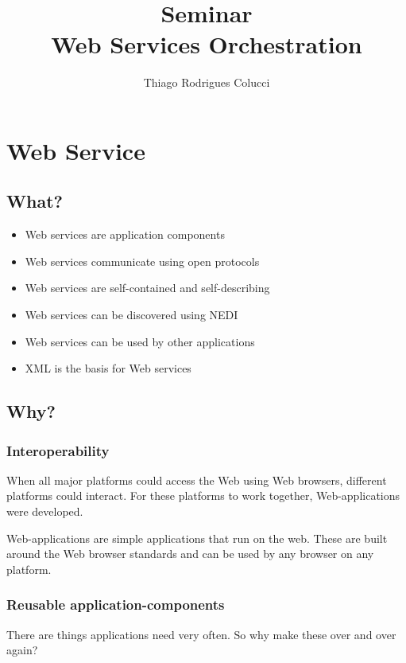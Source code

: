 \documentclass[12pt,a4paper]{article}
\title{Seminar\\Web Services Orchestration}
\author{Thiago Rodrigues Colucci}
\begin{document}
\maketitle

\newpage

\tableofcontents

\newpage

\section{Web Service}
\subsection{What?}
\begin{itemize}
\item Web services are application components
\item Web services communicate using open protocols
\item Web services are self-contained and self-describing
\item Web services can be discovered using NEDI
\item Web services can be used by other applications
\item XML is the basis for Web services
\end{itemize}
\subsection{Why?}

\subsubsection{Interoperability}

When all major platforms could access the Web using Web browsers, different platforms could interact. For these platforms to work together, Web-applications were developed.

Web-applications are simple applications that run on the web. These are built around the Web browser standards and can be used by any browser on any platform.

\subsubsection{Reusable application-components}

There are things applications need very often. So why make these over and over again?
\end{document}
